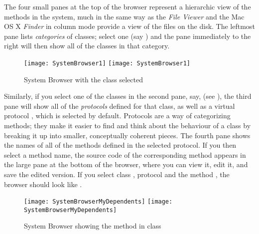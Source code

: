 \documentclass[a4paper,10pt,twoside]{book}
\begin{document}
The four small panes at the top of the browser represent a hierarchic view of the methods in the system, much in the same way as the  \textit{File Viewer} and the Mac OS X \textit{Finder} in column mode provide a view of the files on the disk.
The leftmost pane lists \emph{categories} of classes; select one (say ) and the pane immediately to the right will then show all of the classes in that category.

\begin{figure}[htbp]
   \centering
   \ifluluelse
	   {\texttt{[image: SystemBrowser1]} }
	   {\texttt{[image: SystemBrowser1]} }
   \caption{System Browser with the class  selected
   \label{fig:SystemBrowserModel}}
\end{figure}

Similarly, if you select one of the classes in the second pane, say,  (see  ), the third pane will show all of the \emph{protocols} defined for that class, as well as a virtual protocol , which is selected by default. 
Protocols are a way of categorizing methods; they make it easier to find and think about the behaviour of a class by breaking it up into smaller, conceptually coherent pieces.  
The fourth pane shows the names of all of the methods defined in the selected protocol.
If you then select a method name, the source code of the corresponding method appears in the large pane at the bottom of the browser, where you can view it, edit it, and save the edited version.
If you select class ,  protocol  and the method , the browser should look like .

\begin{figure}[htbp]
   \centering
   \ifluluelse
	   {\texttt{[image: SystemBrowserMyDependents]}}
	   {\texttt{[image: SystemBrowserMyDependents]}}
   \caption{System Browser showing the  method in class 
   \label{fig:SystemBrowserMyDependents}}
\end{figure}
\end{document}
